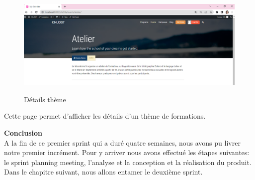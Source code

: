 \newpage
\begin{figure}[!h]
	\centering
	{\includegraphics[width=1\textwidth]{D) IMAGES/Modifier.png}}
	\caption{Détails thème}
	\label{Diagramme3}
\end{figure}
Cette page permet d'afficher les détails d'un thème de formations.



\textbf{Conclusion}\\
A la fin de ce premier sprint qui a duré quatre semaines, nous avons pu livrer notre premier incrément. Pour y arriver nous avons effectué les étapes suivantes: le sprint planning meeting, l'analyse et la conception et la réalisation du produit.\\
Dans le chapitre suivant, nous allons entamer le deuxième sprint.




